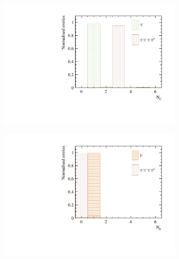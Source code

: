 \begin{figure}[htbp]
\centering
\begin{subfigure}[b]{0.45\textwidth}
 \includegraphics[width=\textwidth]{tau/var3/nCharge_100GeV_improved.pdf}
  \caption{}
  \label{fig:tauVarNCharge}
\end{subfigure}
\begin{subfigure}[b]{0.45\textwidth}
 \includegraphics[width=\textwidth]{tau/var3/nMuon_100GeV_improved.pdf}
  \caption{}
  \label{fig:tauVarNMuon}
\end{subfigure}
\begin{subfigure}[b]{0.45\textwidth}

\end{subfigure}
\end{figure}
